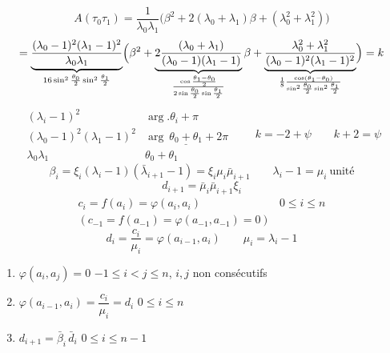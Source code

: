 \documentclass[11pt,a4paper]{article}
\begin{document}
\[
A(\tau_0\tau_1) = \frac{1}{\lambda_0\lambda_1}\bigl(\beta^2 + 2(\lambda_0 + \lambda_1)\beta + (\lambda_0^2 + \lambda_1^2)\bigr)
\]
\[
= \underbrace{\frac{(\lambda_0 - 1)^2(\lambda_1 - 1)^2}{\lambda_0\lambda_1}}_{16\sin^2\frac{\theta_0}{2}\sin^2\frac{\theta_1}{2}}
\Bigl(\beta^2 + \underbrace{2\frac{(\lambda_0 + \lambda_1)}{(\lambda_0 - 1)(\lambda_1 - 1)}}_{\frac{\cos\frac{\theta_1 - \theta_0}{2}}{2\sin\frac{\theta_0}{2}\sin\frac{\theta_1}{2}}}\beta + \underbrace{\frac{\lambda_0^2 + \lambda_1^2}{(\lambda_0 - 1)^2(\lambda_1 - 1)^2}}_{\frac{1}{8}\frac{\cos(\theta_1 - \theta_0)}{\sin^2\frac{\theta_0}{2}\sin^2\frac{\theta_1}{2}}}\Bigr) = k
\]
\[
\begin{array}{ll}
(\lambda_i - 1)^2 & \arg. \theta_i + \pi\\
(\lambda_0 - 1)^2(\lambda_1 - 1)^2 & \arg\ \underline{\theta_0 + \theta_1} + 2\pi\\
\lambda_0\lambda_1 & \theta_0 + \theta_1
\end{array}
\qquad
k = -2 + \psi \qquad k + 2 = \psi
\]
\[
\beta_i = \xi_i(\lambda_i - 1)(\bar{\lambda}_{i+1} - 1) = \xi_i\mu_i\bar{\mu}_{i+1} \qquad \lambda_i - 1 = \mu_i \ \text{unité}
\]
\[
d_{i+1} = \bar{\mu}_i\bar{\mu}_{i+1}\xi_i
\]
\[
\begin{array}{ll}
c_i = f(a_i) = \varphi(a_i, a_i) & 0 \leq i \leq n\\
(c_{-1} = f(a_{-1}) = \varphi(a_{-1}, a_{-1}) = 0) &
\end{array}
\]
\[
d_i = \frac{c_i}{\mu_i} = \varphi(a_{i-1}, a_i) \qquad \mu_i = \lambda_i - 1
\]
\begin{enumerate}
\item[1)] $\varphi(a_i, a_j) = 0$ \quad $-1 \leq i < j \leq n$, $i, j$ non consécutifs
\item[2)] $\varphi(a_{i-1}, a_i) = \dfrac{c_i}{\mu_i} = d_i$ \quad $0 \leq i \leq n$
\item[3)] $d_{i+1} = \bar{\beta}_i\,\bar{d}_i$ \quad $0 \leq i \leq n-1$
\end{enumerate}
\end{document}
